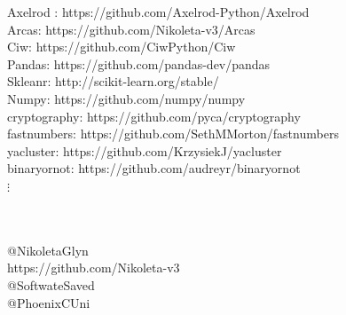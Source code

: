 \documentclass{beamer}
\theoremstyle{definition}
\begin{document}
\begin{frame}
\begin{center}
    \small{Axelrod : https://github.com/Axelrod-Python/Axelrod} \\
    \vspace{3mm}
    \small{Arcas: https://github.com/Nikoleta-v3/Arcas} \\
    \vspace{3mm}
    \small{Ciw: https://github.com/CiwPython/Ciw} \\
    \vspace{3mm}
    \small{Pandas: https://github.com/pandas-dev/pandas} \\
    \vspace{3mm}
    \small{Skleanr: http://scikit-learn.org/stable/} \\
    \vspace{3mm}
    \small{Numpy: https://github.com/numpy/numpy} \\
    \vspace{3mm}
    \small{cryptography: https://github.com/pyca/cryptography} \\
    \vspace{3mm}
    \small{fastnumbers: https://github.com/SethMMorton/fastnumbers} \\
    \vspace{3mm}
    \small{yacluster: https://github.com/KrzysiekJ/yacluster} \\
    \vspace{3mm}
    \small{binaryornot: https://github.com/audreyr/binaryornot} \\
    \huge{$\vdots$}
\end{center}
\end{frame}

\begin{frame}
\begin{center}
\end{center}
\end{frame}

\begin{frame}
	\begin{center}
		\huge{\textbf{}}\\~\\
		\small{@NikoletaGlyn}\\
		\small{https://github.com/Nikoleta-v3}\\
		\small{@SoftwateSaved} \\
		\small{@PhoenixCUni}
	\end{center}
\end{frame}
\end{document}
